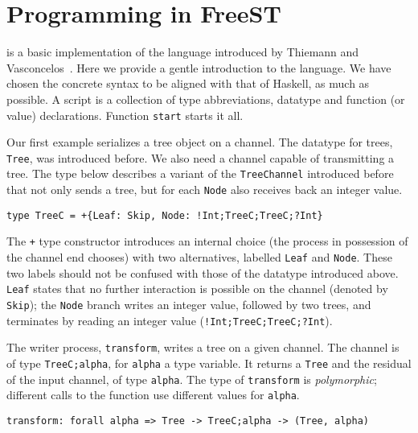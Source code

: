 \section{Programming in FreeST}
\label{sec:programming}

\freest{} is a basic implementation of the language introduced by
Thiemann and Vasconcelos~\cite{DBLP:conf/icfp/ThiemannV16}. Here we
provide a gentle introduction to the language.
%
We have chosen the concrete syntax to be aligned with that of Haskell,
as much as possible. A \freest{} script is a collection of type
abbreviations, datatype and function (or value) declarations. Function
\lstinline|start| starts it all.

Our first example serializes a tree object on a channel. The datatype
for trees, \lstinline|Tree|, was introduced before.  We also need a
channel capable of transmitting a tree. The type below describes a
variant of the \lstinline|TreeChannel| introduced before that not only
sends a tree, but for each \lstinline|Node| also receives back an
integer value.
%
\begin{lstlisting}
type TreeC = +{Leaf: Skip, Node: !Int;TreeC;TreeC;?Int}
\end{lstlisting}

The \lstinline|+| type constructor introduces an internal choice (the
process in possession of the channel end chooses) with two
alternatives, labelled \lstinline|Leaf| and \lstinline|Node|. These
two labels should not be confused with those of the datatype
introduced above. \lstinline|Leaf| states that no further interaction
is possible on the channel (denoted by \lstinline|Skip|); the
\lstinline|Node| branch writes an integer value, followed by two
trees, and terminates by reading an integer value
(\lstinline|!Int;TreeC;TreeC;?Int|).

The writer process, \lstinline|transform|, writes a tree on a given
channel. The channel is of type \lstinline|TreeC;alpha|, for
\lstinline|alpha| a type variable. It returns a \lstinline|Tree| and
the residual of the input channel, of type \lstinline|alpha|. The type
of \lstinline|transform| is \emph{polymorphic}; different calls to the
function use different values for \lstinline|alpha|.

\begin{lstlisting}
transform: forall alpha => Tree -> TreeC;alpha -> (Tree, alpha)
\end{lstlisting}

